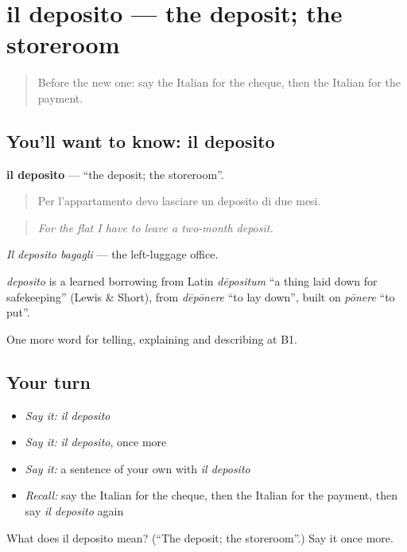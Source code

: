 \section[il deposito]{il deposito — the deposit; the storeroom}

\label{lesson:IT-C396-deposito}



\begin{quote}
Before the new one: say the Italian for the cheque, then the Italian for the payment.
\end{quote}

\subsection*{You'll want to know: il deposito}
\textbf{il deposito} — \textquotedblleft{}the deposit; the storeroom\textquotedblright{}.

\begin{quote}
Per l'appartamento devo lasciare un deposito di due mesi.
\end{quote}

\begin{quote}
\emph{For the flat I have to leave a two-month deposit.}
\end{quote}

\emph{Il deposito bagagli} — the left-luggage office.

\begin{cousinweb}
\emph{deposito} is a learned borrowing from Latin \emph{dēpositum} \textquotedblleft{}a thing laid down for safekeeping\textquotedblright{} (Lewis \& Short), from \emph{dēpōnere} \textquotedblleft{}to lay down\textquotedblright{}, built on \emph{pōnere} \textquotedblleft{}to put\textquotedblright{}.
\end{cousinweb}

\begin{grammarlens}[title={What you've built}]
One more word for telling, explaining and describing at B1.
\end{grammarlens}

\subsection*{Your turn}
\begin{itemize}
\raggedright
  \item \emph{Say it:} \emph{il deposito}
  \item \emph{Say it:} \emph{il deposito}, once more
  \item \emph{Say it:} a sentence of your own with \emph{il deposito}
  \item \emph{Recall:} say the Italian for the cheque, then the Italian for the payment, then say \emph{il deposito} again
\end{itemize}

\begin{tcolorbox}[breakable,colback=teal!4,colframe=teal!35!black,title={Before you move on}]
What does il deposito mean? (\textquotedblleft{}The deposit; the storeroom\textquotedblright{}.) Say it once more.
\end{tcolorbox}
